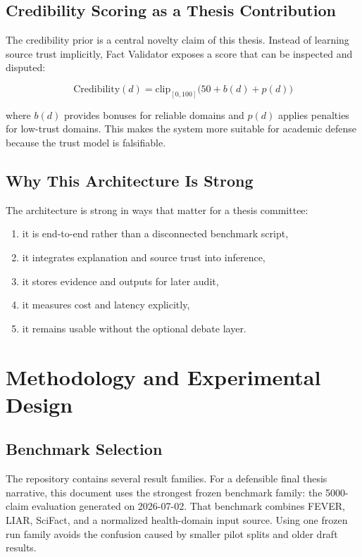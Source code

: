 \documentclass[12pt,a4paper,openright]{report}
\begin{document}
\section{Credibility Scoring as a Thesis Contribution}

The credibility prior is a central novelty claim of this thesis. Instead of learning source trust implicitly, Fact Validator exposes a score that can be inspected and disputed:

\[
\mathrm{Credibility}(d) = \mathrm{clip}_{[0,100]}\bigl(50 + b(d) + p(d)\bigr)
\]

where $b(d)$ provides bonuses for reliable domains and $p(d)$ applies penalties for low-trust domains. This makes the system more suitable for academic defense because the trust model is falsifiable.

\section{Why This Architecture Is Strong}

The architecture is strong in ways that matter for a thesis committee:

\begin{enumerate}
  \item it is end-to-end rather than a disconnected benchmark script,
  \item it integrates explanation and source trust into inference,
  \item it stores evidence and outputs for later audit,
  \item it measures cost and latency explicitly,
  \item it remains usable without the optional debate layer.
\end{enumerate}

\chapter{Methodology and Experimental Design}

\section{Benchmark Selection}

The repository contains several result families. For a defensible final thesis narrative, this document uses the strongest frozen benchmark family: the 5000-claim evaluation generated on 2026-07-02. That benchmark combines FEVER, LIAR, SciFact, and a normalized health-domain input source. Using one frozen run family avoids the confusion caused by smaller pilot splits and older draft results.
\end{document}
